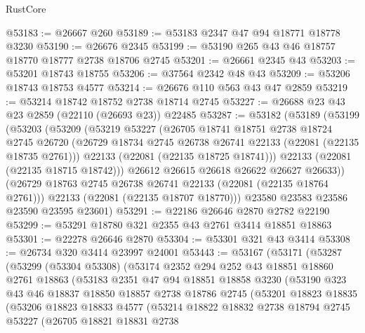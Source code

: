 \begin{lexlean}{RustCore}
\begin{coremodule}
@53183 := @26667 @260
@53189 := @53183 @2347 @47 @94 @18771 @18778 @3230
@53190 := @26676 @2345
@53199 := @53190 @265 @43 @46 @18757 @18770 @18777 @2738 @18706 @2745
@53201 := @26661 @2345 @43
@53203 := @53201 @18743 @18755
@53206 := @37564 @2342 @48 @43
@53209 := @53206 @18743 @18753 @4577
@53214 := @26676 @110 @563 @43 @47 @2859
@53219 := @53214 @18742 @18752 @2738 @18714 @2745
@53227 := @26688 @23 @43 @23 @2859 (@22110 (@26693 @23)) @22485
@53287 := @53182
    (@53189
      (@53199
        (@53203
          (@53209
            (@53219
              @53227
              (@26705
                @18741
                @18751
                @2738
                @18724
                @2745
                @26720
                (@26729 @18734 @2745 @26738 @26741 @22133 (@22081 (@22135 @18735 @2761)))
                @22133
                (@22081 (@22135 @18725 @18741)))
              @22133
              (@22081 (@22135 @18715 @18742)))
            @26612
            @26615
            @26618
            @26622
            @26627
            @26633))
        (@26729 @18763 @2745 @26738 @26741 @22133 (@22081 (@22135 @18764 @2761)))
        @22133
        (@22081 (@22135 @18707 @18770)))
      @23580
      @23583
      @23586
      @23590
      @23595
      @23601)
@53291 := @22186 @26646 @2870 @2782 @22190
@53299 := @53291 @18780 @321 @2355 @43 @2761 @3414 @18851 @18863
@53301 := @22278 @26646 @2870
@53304 := @53301 @321 @43 @3414
@53308 := @26734 @320 @3414 @23997 @24001
@53443 := @53167
    (@53171
      (@53287
        (@53299
          (@53304 @53308)
          (@53174
            @2352
            @294
            @252
            @43
            @18851
            @18860
            @2761
            @18863
            (@53183
              @2351
              @47
              @94
              @18851
              @18858
              @3230
              (@53190
                @323
                @43
                @46
                @18837
                @18850
                @18857
                @2738
                @18786
                @2745
                (@53201
                  @18823
                  @18835
                  (@53206
                    @18823
                    @18833
                    @4577
                    (@53214
                      @18822
                      @18832
                      @2738
                      @18794
                      @2745
                      @53227
                      (@26705
                        @18821
                        @18831
                        @2738

\end{coremodule}
\end{lexlean}
